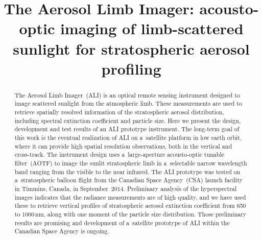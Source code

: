 \documentclass[amt]{copernicus}
\begin{document}
\title{The Aerosol Limb Imager: acousto-optic imaging of limb-scattered
sunlight for stratospheric aerosol profiling}







\published{}




\maketitle


\begin{abstract}
  The Aerosol Limb Imager~(ALI) is an optical remote sensing
  instrument designed to image scattered sunlight from the atmospheric
  limb. These measurements are used to retrieve spatially resolved
  information of the stratospheric aerosol distribution, including
  spectral extinction coefficient and particle size. Here we present
  the design, development and test results of an ALI prototype
  instrument. The long-term goal of this work is the eventual
  realization of ALI on a~satellite platform in low earth orbit, where
  it can provide high spatial resolution observations, both in the
  vertical and cross-track. The instrument design uses a~large-aperture acousto-optic tunable filter~(AOTF) to image the sunlit
  stratospheric limb in a~selectable narrow wavelength band ranging
  from the visible to the near infrared. The ALI prototype was tested
  on a~stratospheric balloon flight from the Canadian Space Agency~(CSA) launch facility in Timmins, Canada, in
  September~2014. Preliminary analysis of the hyperspectral images
  indicates that the radiance measurements are of high quality, and we
  have used these to retrieve vertical profiles of stratospheric
  aerosol extinction coefficient from 650 to 1000\,\unit{nm}, along with
  one moment of the particle size distribution. Those preliminary
  results are promising and development of a~satellite prototype of
  ALI within the Canadian Space Agency is ongoing.
\end{abstract}
\end{document}
